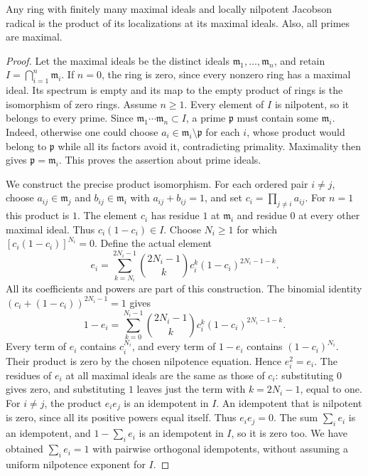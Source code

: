 \begin{lemma}
\label{editorial-source-lemma-product-local}
Any ring with finitely many maximal ideals and
locally nilpotent Jacobson radical is the product of its localizations
at its maximal ideals. Also, all primes are maximal.
\end{lemma}

\begin{proof}
Let the maximal ideals be the distinct ideals
$\mathfrak m_1,\ldots,\mathfrak m_n$, and retain
$I=\bigcap_{i=1}^n\mathfrak m_i$.
If $n=0$, the ring is zero, since every nonzero ring has a
maximal ideal. Its spectrum is empty and its map to the empty
product of rings is the isomorphism of zero rings. Assume $n\geq1$.
Every element of $I$ is nilpotent, so it belongs to every prime.
Since $\mathfrak m_1\cdots\mathfrak m_n\subset I$, a prime
$\mathfrak p$ must contain some $\mathfrak m_i$.
Indeed, otherwise one could choose $a_i\in\mathfrak m_i\setminus
\mathfrak p$ for each $i$, whose product would belong to
$\mathfrak p$ while all its factors avoid it, contradicting
primality. Maximality then gives $\mathfrak p=\mathfrak m_i$.
This proves the assertion about prime ideals.

We construct the precise product isomorphism. For each ordered
pair $i\neq j$, choose $a_{ij}\in\mathfrak m_j$ and
$b_{ij}\in\mathfrak m_i$ with $a_{ij}+b_{ij}=1$, and set
$c_i=\prod_{j\neq i}a_{ij}$. For $n=1$ this product is $1$.
The element $c_i$ has residue $1$ at $\mathfrak m_i$ and
residue $0$ at every other maximal ideal. Thus
$c_i(1-c_i)\in I$. Choose $N_i\geq1$ for which
$[c_i(1-c_i)]^{N_i}=0$. Define the actual element
$$
e_i=\sum_{k=N_i}^{2N_i-1}
\binom{2N_i-1}{k}c_i^k(1-c_i)^{2N_i-1-k}.
$$
All its coefficients and powers are part of this construction.
The binomial identity $(c_i+(1-c_i))^{2N_i-1}=1$ gives
$$
1-e_i=\sum_{k=0}^{N_i-1}
\binom{2N_i-1}{k}c_i^k(1-c_i)^{2N_i-1-k}.
$$
Every term of $e_i$ contains $c_i^{N_i}$, and every term of
$1-e_i$ contains $(1-c_i)^{N_i}$. Their product is zero by
the chosen nilpotence equation. Hence $e_i^2=e_i$.
The residues of $e_i$ at all maximal ideals are the same as
those of $c_i$: substituting $0$ gives zero, and substituting
$1$ leaves just the term with $k=2N_i-1$, equal to one.
For $i\neq j$, the product $e_ie_j$ is an idempotent in $I$.
An idempotent that is nilpotent is zero, since all its positive
powers equal itself. Thus $e_ie_j=0$.
The sum $\sum_i e_i$ is an idempotent, and
$1-\sum_i e_i$ is an idempotent in $I$, so it is zero too.
We have obtained $\sum_i e_i=1$ with pairwise orthogonal
idempotents, without assuming a uniform nilpotence exponent for $I$.


\end{proof}
